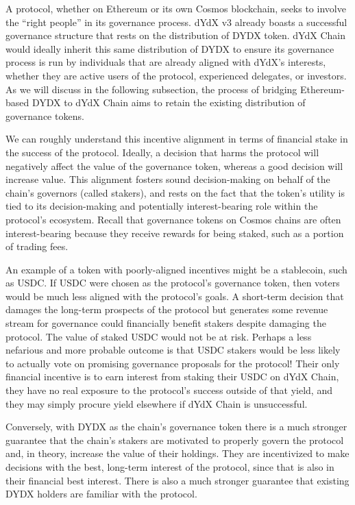         A protocol, whether on Ethereum or its own Cosmos blockchain, seeks to involve the ``right people'' in its governance process. dYdX v3 already boasts a successful governance structure that rests on the distribution of DYDX token. dYdX Chain would ideally inherit this same distribution of DYDX to ensure its governance process is run by individuals that are already aligned with dYdX's interests, whether they are active users of the protocol, experienced delegates, or investors. As we will discuss in the following subsection, the process of bridging Ethereum-based DYDX to dYdX Chain aims to retain the existing distribution of governance tokens.

        We can roughly understand this incentive alignment in terms of financial stake in the success of the protocol. Ideally, a decision that harms the protocol will negatively affect the value of the governance token, whereas a good decision will increase value. This alignment fosters sound decision-making on behalf of the chain's governors (called stakers), and rests on the fact that the token's utility is tied to its decision-making and potentially interest-bearing role within the protocol's ecosystem. Recall that governance tokens on Cosmos chains are often interest-bearing because they receive rewards for being staked, such as a portion of  trading fees. 
        
        An example of a token with poorly-aligned incentives might be a stablecoin, such as USDC. If USDC were chosen as the protocol's governance token, then voters would be much less aligned with the protocol's goals. A short-term decision that damages the long-term prospects of the protocol but generates some revenue stream for governance could financially benefit stakers despite damaging the protocol. The value of staked USDC would not be at risk. Perhaps a less nefarious and more probable outcome is that USDC stakers would be less likely to actually vote on promising governance proposals for the protocol! Their only financial incentive is to earn interest from staking their USDC on dYdX Chain, they have no real exposure to the protocol's success outside of that yield, and they may simply procure yield elsewhere if dYdX Chain is unsuccessful. 
        
        Conversely, with DYDX as the chain's governance token there is a much stronger guarantee that the chain's stakers are motivated to properly govern the protocol and, in theory, increase the value of their holdings. They are incentivized to make decisions with the best, long-term interest of the protocol, since that is also in their financial best interest. There is also a much stronger guarantee that existing DYDX holders are familiar with the protocol. 

